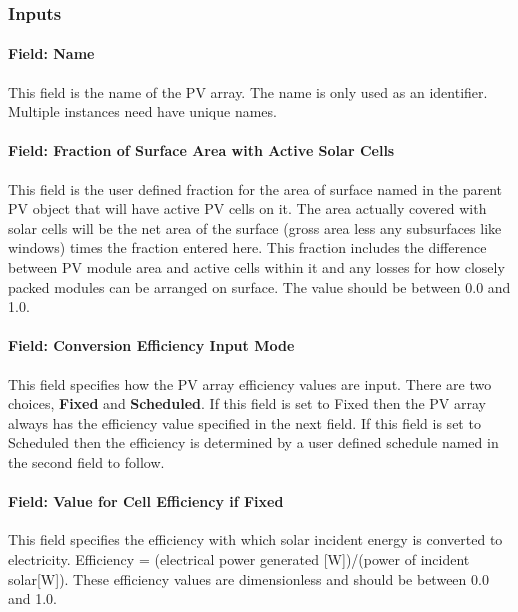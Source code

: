\subsubsection{Inputs}\label{inputs-21-000}

\paragraph{Field: Name}\label{field-name-24}

This field is the name of the PV array. The name is only used as an identifier. Multiple instances need have unique names.

\paragraph{Field: Fraction of Surface Area with Active Solar Cells}\label{field-fraction-of-surface-area-with-active-solar-cells}

This field is the user defined fraction for the area of surface named in the parent PV object that will have active PV cells on it. The area actually covered with solar cells will be the net area of the surface (gross area less any subsurfaces like windows) times the fraction entered here. This fraction includes the difference between PV module area and active cells within it and any losses for how closely packed modules can be arranged on surface. The value should be between 0.0 and 1.0.

\paragraph{Field: Conversion Efficiency Input Mode}\label{field-conversion-efficiency-input-mode}

This field specifies how the PV array efficiency values are input. There are two choices, \textbf{Fixed} and \textbf{Scheduled}. If this field is set to Fixed then the PV array always has the efficiency value specified in the next field. If this field is set to Scheduled then the efficiency is determined by a user defined schedule named in the second field to follow.

\paragraph{Field: Value for Cell Efficiency if Fixed}\label{field-value-for-cell-efficiency-if-fixed}

This field specifies the efficiency with which solar incident energy is converted to electricity. Efficiency = (electrical power generated {[}W{]})/(power of incident solar{[}W{]}). These efficiency values are dimensionless and should be between 0.0 and 1.0.

